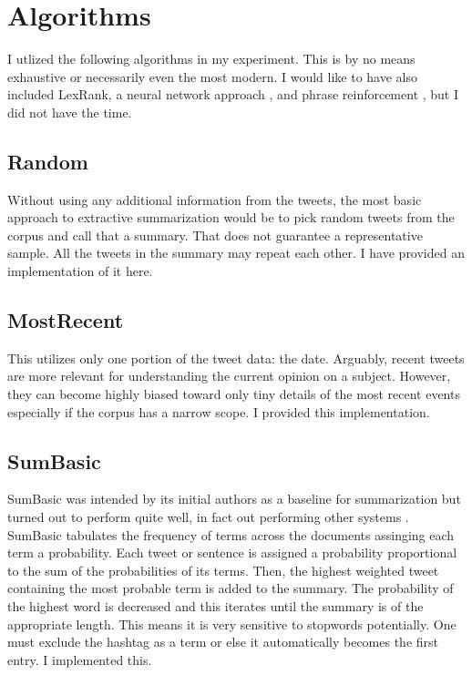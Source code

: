 \documentclass[paper=letter, fontsize=12pt]{article}
\begin{document}
\section{Algorithms}
I utlized the following algorithms in my experiment. This is by no means exhaustive or necessarily even the most modern. I would like to have also included LexRank\cite{Erkan2004}, a neural network approach \cite{Wang2016}, and phrase reinforcement \cite{Sharifi2010}, but I did not have the time. 

\subsection{Random}
Without using any additional information from the tweets, the most basic approach to extractive summarization would be to pick random tweets from the corpus and call that a summary. That does not guarantee a representative sample. All the tweets in the summary may repeat each other. I have provided an implementation of it here. 

\subsection{MostRecent}
This utilizes only one portion of the tweet data: the date. Arguably, recent tweets are more relevant for understanding the current opinion on a subject. However, they can become highly biased toward only tiny details of the most recent events especially if the corpus has a narrow scope. I provided this implementation. 

\subsection{SumBasic}
SumBasic was intended by its initial authors as a baseline for summarization but turned out to perform quite well, in fact out performing other systems \cite{Nenkova2005}. SumBasic tabulates the frequency of terms across the documents assinging each term a probability. Each tweet or sentence is assigned a probability proportional to the sum of the probabilities of its terms. Then, the highest weighted tweet containing the most probable term is added to the summary. The probability of the highest word is decreased and this iterates until the summary is of the appropriate length. This means it is very sensitive to stopwords potentially. One must exclude the hashtag as a term or else it automatically becomes the first entry. I implemented this. 
\end{document}
